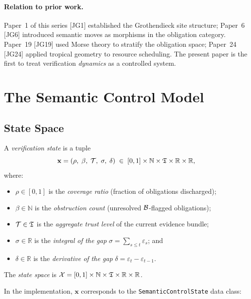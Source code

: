 \documentclass[11pt]{article}
\newcommand{\xstate}{\mathbf{x}}           %
\newcommand{\vcov}{\rho}                   %
\newcommand{\vgap}{\varepsilon}            %
\newcommand{\vint}{\sigma}                 %
\newcommand{\vdiff}{\delta}                %
\newcommand{\Xsp}{\mathcal{X}}            %
\newcommand{\obcount}{\beta}              %
\newcommand{\NatNum}{\mathbb{N}}
\newcommand{\RealNum}{\mathbb{R}}
\newcommand{\citeJGi}{[JG1]}
\newcommand{\citeJGvi}{[JG6]}
\newcommand{\citeJGxix}{[JG19]}
\newcommand{\citeJGxxiv}{[JG24]}
\begin{document}
\paragraph{Relation to prior work.}
Paper~1 of this series \citeJGi{} established the Grothendieck site
structure; Paper~6 \citeJGvi{} introduced semantic moves as morphisms in
the obligation category.  Paper~19 \citeJGxix{} used Morse theory to
stratify the obligation space; Paper~24 \citeJGxxiv{} applied tropical
geometry to resource scheduling.  The present paper is the first to
treat verification \emph{dynamics} as a controlled system.

\section{The Semantic Control Model}
\label{sec:model}

\subsection{State Space}

\begin{definition}
  A \emph{verification state} is a tuple
  \[
    \xstate = (\vcov,\; \obcount,\; \trust,\; \vint,\; \vdiff)
    \;\in\; [0,1] \times \NatNum \times \Talg \times \RealNum \times \RealNum,
  \]
  where:
  \begin{itemize}
    \item $\vcov \in [0,1]$ is the \emph{coverage ratio}
          (fraction of obligations discharged);
    \item $\obcount \in \NatNum$ is the \emph{obstruction count}
          (unresolved $\mathcal{B}$-flagged obligations);
    \item $\mathcal{T} \in \mathfrak{T}$ is the \emph{aggregate trust level}
          of the current evidence bundle;
    \item $\vint \in \RealNum$ is the \emph{integral of the gap}
          $\vint = \sum_{s \le t} \vgap_s$; and
    \item $\vdiff \in \RealNum$ is the \emph{derivative of the gap}
          $\vdiff = \vgap_t - \vgap_{t-1}$.
  \end{itemize}
  The \emph{state space} is $\Xsp = [0,1] \times \NatNum \times \Talg
  \times \RealNum \times \RealNum$.
\end{definition}

\noindent
In the \JuGeo{} implementation, $\xstate$ corresponds to the
\texttt{SemanticControlState} data class:
\end{document}

